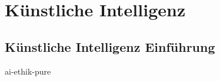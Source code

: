 \section{Künstliche Intelligenz}
\label{sec:ai}
\subsection{Künstliche Intelligenz Einführung}
ai-ethik-pure
